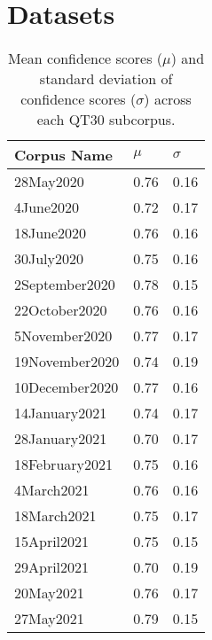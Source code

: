 \documentclass{article}
\title{}
\author{\\ID: \\AC40001 Honours Project\\BSc (Hons) Computing Science\\University of Dundee\\Supervisor: }
\date{\vspace{5ex}}
\begin{document}



\setcounter{table}{20}

\appendix

\section{Datasets}\label{datasets}

\begin{table}[H]
\centering
\caption{Mean confidence scores ($\mu$) and standard deviation of confidence scores ($\sigma$) across each QT30 subcorpus. \label{tbl:qt-confidence}}
\begin{tabular}{|l|ll|}
\hline
Corpus Name     & $\mu$ & $\sigma$ \\ \hline
28May2020       & 0.76            & 0.16               \\
4June2020       & 0.72            & 0.17               \\
18June2020      & 0.76            & 0.16               \\
30July2020      & 0.75            & 0.16               \\
2September2020  & 0.78            & 0.15               \\
22October2020   & 0.76            & 0.16               \\
5November2020   & 0.77            & 0.17               \\
19November2020  & 0.74            & 0.19               \\
10December2020  & 0.77            & 0.16               \\
14January2021   & 0.74            & 0.17               \\
28January2021   & 0.70            & 0.17               \\
18February2021  & 0.75            & 0.16               \\
4March2021      & 0.76            & 0.16               \\
18March2021     & 0.75            & 0.17               \\
15April2021     & 0.75            & 0.15               \\
29April2021     & 0.70            & 0.19               \\
20May2021       & 0.76            & 0.17               \\
27May2021       & 0.79            & 0.15               \\

\end{tabular}
\end{table}
\end{document}
